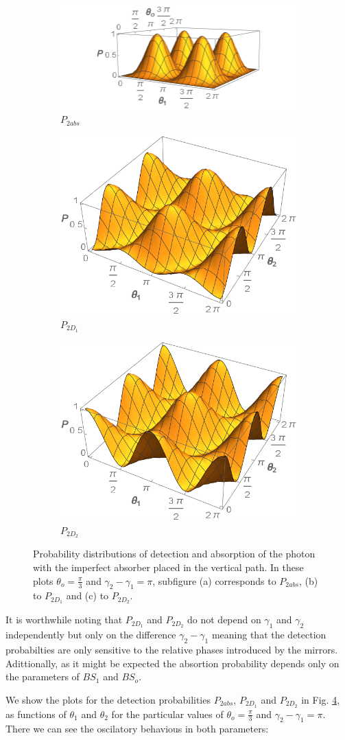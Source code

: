 \documentclass[12pt]{book}
\begin{document}
\begin{figure}[t!]
\centering
\begin{subfigure}[b]{0.45\linewidth}
\includegraphics[width=\linewidth,height=2.8 cm]{images/P1abs.png}
\caption{$P_{2abs}$}
\label{fig:BS2}
\end{subfigure}
\begin{subfigure}[b]{0.45\linewidth}
\includegraphics[width=\linewidth,height=2.8 cm]{images/P1d1.png}
\caption{$P_{2D_{1}}$}
\label{fig:westminster_aerea}
\end{subfigure}
\begin{subfigure}[b]{0.45\linewidth}
\includegraphics[width=\linewidth,height=2.8 cm]{images/P1d2.png}
\caption{$P_{2D_{2}}$}
\label{fig:BS2}
\end{subfigure}
\caption{Probability distributions of detection and absorption of the photon with the imperfect absorber placed in the vertical path. In these plots $\theta_{o}=\frac{\pi}{3}$ and $\gamma_{2}-\gamma_{1}=\pi$, subfigure (a) corresponds to $P_{2abs}$, (b) to $P_{2D_{1}}$ and (c) to $P_{2D_{2}}$.}
\label{P_bs}
\end{figure}
It is worthwhile noting that $P_{2D_{1}}$ and $P_{2D_{2}}$ do not depend on $\gamma_{1}$ and $\gamma_{2}$ independently but only on the difference $\gamma_{2}-\gamma_{1}$ meaning that the detection probabilties are only sensitive to the relative phases introduced by the mirrors. Adittionally, as it might be expected the absortion probability depends only on the parameters of $BS_{1}$ and $BS_{o}$.

We show the plots for the detection probabilities $P_{2abs}$, $P_{2D_{1}}$ and $P_{2D_{2}}$ in Fig. \ref{P_bs}, as functions of $\theta_{1}$ and $\theta_{2}$ for the particular values of $\theta_{o}=\frac{\pi}{3}$ and $\gamma_{2}-\gamma_{1}=\pi$. There we can see the oscilatory behavious in both parameters:
\end{document}
